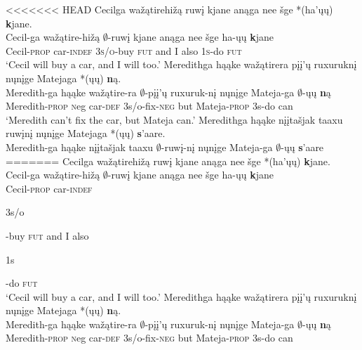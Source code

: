 \documentclass[output=paper]{LSP/langsci}
\begin{document}
\begin{exe}
\ex
\begin{xlist}
\ex
<<<<<<< HEAD
\glll Cecilga wažątirehižą ruwį kjane anąga nee šge *(ha'ųų) {\textbf kjane}.\\
Cecil-ga wažątire-hižą $\emptyset$-ruwį kjane anąga nee šge ha-ųų {\textbf kjane}\\
Cecil-\textsc{prop} car-\textsc{indef} \textsc{3s/o}-buy \textsc{fut} and I also \textsc{1s}-do \textsc{fut}\\
\trans `Cecil will buy a car, and I will too.' 
\ex
\glll Meredithga hąąke wažątirera {pįį'ų ruxuruknį} nųnįge Matejaga *(ųų) {\textbf ną}.\\
Meredith-ga hąąke wažątire-ra {$\emptyset$-pįį'ų ruxuruk-nį} nųnįge Mateja-ga $\emptyset$-ųų {\textbf ną}\\
Meredith-\textsc{prop} {\textsc neg} car-\textsc{def} {\textsc 3s/o}-fix-\textsc{neg} but Mateja-\textsc{prop} {\textsc 3s}-do can\\
\trans `Meredith can't fix the car, but Mateja can.'
\ex
\glll Meredithga hąąke {nįįtašjak taaxu} ruwįnį nųnįge Matejaga *(ųų) {\textbf s'aare}.\\ 
Meredith-ga hąąke {nįįtašjak taaxu} $\emptyset$-ruwį-nį nųnįge Mateja-ga $\emptyset$-ųų {\textbf s'aare}\\
=======
\glll Cecilga wa\v{z}\k{a}tirehi\v{z}\k{a} ruw\k{i} kjane an\k{a}ga nee \v{s}ge *(ha'\k{u}\k{u}) {\textbf kjane}.\\
Cecil-ga wa\v{z}\k{a}tire-hi\v{z}\k{a} $\emptyset$-ruw\k{i} kjane an\k{a}ga nee \v{s}ge ha-\k{u}\k{u} {\textbf kjane}\\
Cecil-\textsc{prop} car-\textsc{indef} \begin{sc}3s/o\end{sc}-buy \textsc{fut} and I also \begin{sc}1s\end{sc}-do \textsc{fut}\\
\trans `Cecil will buy a car, and I will too.' 
\ex
\glll Meredithga h\k{a}\k{a}ke wa\v{z}\k{a}tirera {p\k{i}\k{i}'\k{u} ruxurukn\k{i}} n\k{u}n\k{i}ge Matejaga *(\k{u}\k{u}) {\textbf n\k{a}}.\\
Meredith-ga h\k{a}\k{a}ke wa\v{z}\k{a}tire-ra {$\emptyset$-p\k{i}\k{i}'\k{u} ruxuruk-n\k{i}} n\k{u}n\k{i}ge Mateja-ga $\emptyset$-\k{u}\k{u} {\textbf n\k{a}}\\
Meredith-\textsc{prop} {\textsc neg} car-\textsc{def} {\textsc 3s/o}-fix-\textsc{neg} but Mateja-\textsc{prop} {\textsc 3s}-do can\\

\end{xlist}
\end{exe}
\end{document}
